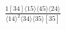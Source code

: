 \documentclass[varwidth, border=5pt]{standalone}
\begin{document}
\begin{my}
$\begin{gathered}
\scriptscriptstyle\frac{1[34]⟨15⟩⟨45⟩⟨24⟩}{⟨14⟩^2⟨34⟩⟨35⟩[35]}
\end{gathered}$
\end{my}
\end{document}
